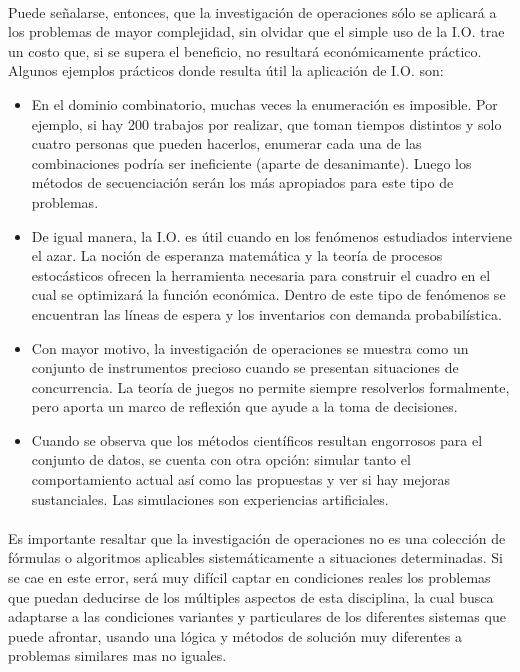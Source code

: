 \documentclass[12pt, a4paper,spanish]{article}
\begin{document}
		\paragraph{}
		Puede señalarse, entonces, que la investigación de operaciones sólo se aplicará a los problemas de mayor complejidad, sin olvidar que el simple uso de la I.O. trae un costo que, si se supera el beneficio, no resultará económicamente práctico. Algunos ejemplos prácticos donde resulta útil la aplicación de I.O. son:\cite{wikipedia_IO}

		\begin{itemize}

			\item En el dominio combinatorio, muchas veces la enumeración es imposible. Por ejemplo, si hay 200 trabajos por realizar, que toman tiempos distintos y solo cuatro personas que pueden hacerlos, enumerar cada una de las combinaciones podría ser ineficiente (aparte de desanimante). Luego los métodos de secuenciación serán los más apropiados para este tipo de problemas.\cite{wikipedia_IO}

			\item De igual manera, la I.O. es útil cuando en los fenómenos estudiados interviene el azar. La noción de esperanza matemática y la teoría de procesos estocásticos ofrecen la herramienta necesaria para construir el cuadro en el cual se optimizará la función económica. Dentro de este tipo de fenómenos se encuentran las líneas de espera y los inventarios con demanda probabilística.\cite{wikipedia_IO}

			\item Con mayor motivo, la investigación de operaciones se muestra como un conjunto de instrumentos precioso cuando se presentan situaciones de concurrencia. La teoría de juegos no permite siempre resolverlos formalmente, pero aporta un marco de reflexión que ayude a la toma de decisiones.\cite{wikipedia_IO}

			\item Cuando se observa que los métodos científicos resultan engorrosos para el conjunto de datos, se cuenta con otra opción: simular tanto el comportamiento actual así como las propuestas y ver si hay mejoras sustanciales. Las simulaciones son experiencias artificiales.\cite{wikipedia_IO}

		\end{itemize}

		\paragraph{}
		Es importante resaltar que la investigación de operaciones no es una colección de fórmulas o algoritmos aplicables sistemáticamente a situaciones determinadas. Si se cae en este error, será muy difícil captar en condiciones reales los problemas que puedan deducirse de los múltiples aspectos de esta disciplina, la cual busca adaptarse a las condiciones variantes y particulares de los diferentes sistemas que puede afrontar, usando una lógica y métodos de solución muy diferentes a problemas similares mas no iguales.\cite{wikipedia_IO}
\end{document}
